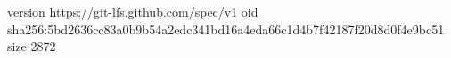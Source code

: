 version https://git-lfs.github.com/spec/v1
oid sha256:5bd2636cc83a0b9b54a2edc341bd16a4eda66c1d4b7f42187f20d8d0f4e9bc51
size 2872
